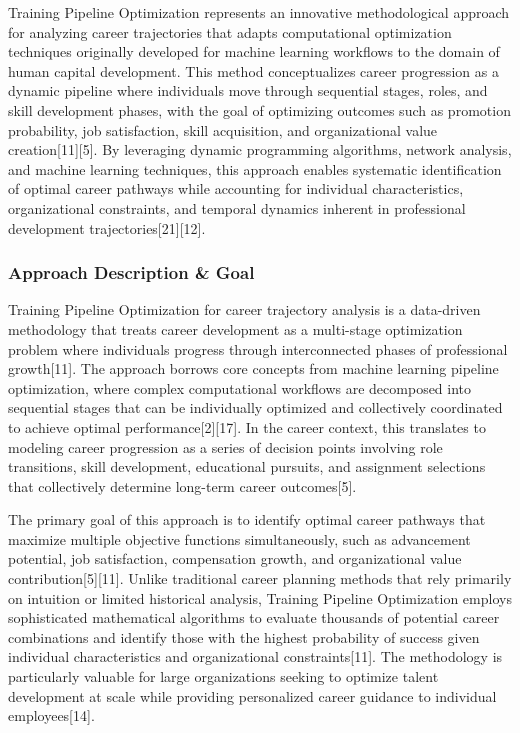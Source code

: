 \documentclass[main.tex]{subfiles}
\begin{document}
Training Pipeline Optimization represents an innovative methodological approach for analyzing career trajectories that adapts computational optimization techniques originally developed for machine learning workflows to the domain of human capital development. This method conceptualizes career progression as a dynamic pipeline where individuals move through sequential stages, roles, and skill development phases, with the goal of optimizing outcomes such as promotion probability, job satisfaction, skill acquisition, and organizational value creation[11][5]. By leveraging dynamic programming algorithms, network analysis, and machine learning techniques, this approach enables systematic identification of optimal career pathways while accounting for individual characteristics, organizational constraints, and temporal dynamics inherent in professional development trajectories[21][12].

\subsubsection{Approach Description \& Goal}

Training Pipeline Optimization for career trajectory analysis is a data-driven methodology that treats career development as a multi-stage optimization problem where individuals progress through interconnected phases of professional growth[11]. The approach borrows core concepts from machine learning pipeline optimization, where complex computational workflows are decomposed into sequential stages that can be individually optimized and collectively coordinated to achieve optimal performance[2][17]. In the career context, this translates to modeling career progression as a series of decision points involving role transitions, skill development, educational pursuits, and assignment selections that collectively determine long-term career outcomes[5].

The primary goal of this approach is to identify optimal career pathways that maximize multiple objective functions simultaneously, such as advancement potential, job satisfaction, compensation growth, and organizational value contribution[5][11]. Unlike traditional career planning methods that rely primarily on intuition or limited historical analysis, Training Pipeline Optimization employs sophisticated mathematical algorithms to evaluate thousands of potential career combinations and identify those with the highest probability of success given individual characteristics and organizational constraints[11]. The methodology is particularly valuable for large organizations seeking to optimize talent development at scale while providing personalized career guidance to individual employees[14].
\end{document}
